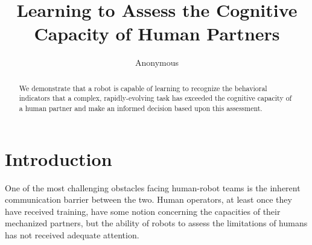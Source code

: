 \documentclass{sig-alternate}
\begin{document}
\title{Learning to Assess the Cognitive Capacity of Human Partners}


\author{
%
\alignauthor
Anonymous\\
}

\maketitle
\begin{abstract} 
We demonstrate that a robot is capable of learning to recognize the
behavioral indicators that a complex, rapidly-evolving task has exceeded
the cognitive capacity of a human partner and make an informed decision
based upon this assessment.
\end{abstract}




\section{Introduction} One of the most challenging obstacles facing human-robot teams is the inherent communication
barrier between the two. Human operators, at least once they have received training, have some notion concerning the
capacities of their mechanized partners, but the ability of robots to assess the limitations of humans has not received
adequate attention.
\end{document}
